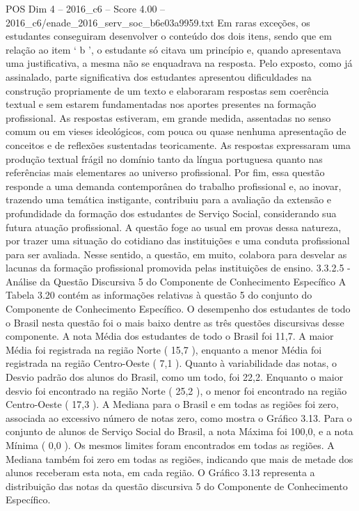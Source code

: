 \begin{textsample}{POS Dim 4 – 2016\_c6 – Score 4.00 – 2016\_c6/enade\_2016\_serv\_soc\_b6e03a9959.txt}
Em raras exceções, os estudantes conseguiram desenvolver o conteúdo dos dois itens, sendo que em relação ao item ‘ b ’, o estudante só citava um princípio e, quando apresentava uma justificativa, a mesma não se enquadrava na resposta.
Pelo exposto, como já assinalado, parte significativa dos estudantes apresentou dificuldades na construção propriamente de um texto e elaboraram respostas sem coerência textual e sem estarem fundamentadas nos aportes presentes na formação profissional.
As respostas estiveram, em grande medida, assentadas no senso comum ou em vieses ideológicos, com pouca ou quase nenhuma apresentação de conceitos e de reflexões sustentadas teoricamente.
As respostas expressaram uma produção textual frágil no domínio tanto da língua portuguesa quanto nas referências mais elementares ao universo profissional.
Por fim, essa questão responde a uma demanda contemporânea do trabalho profissional e, ao inovar, trazendo uma temática instigante, contribuiu para a avaliação da extensão e profundidade da formação dos estudantes de Serviço Social, considerando sua futura atuação profissional.
A questão foge ao usual em provas dessa natureza, por trazer uma situação do cotidiano das instituições e uma conduta profissional para ser avaliada.
Nesse sentido, a questão, em muito, colabora para desvelar as lacunas da formação profissional promovida pelas instituições de ensino. 3.3.2.5 - Análise da Questão Discursiva 5 do Componente de Conhecimento Específico A Tabela 3.20 contém as informações relativas à questão 5 do conjunto do Componente de Conhecimento Específico.
O desempenho dos estudantes de todo o Brasil nesta questão foi o mais baixo dentre as três questões discursivas desse componente.
A nota Média dos estudantes de todo o Brasil foi 11,7.
A maior Média foi registrada na região Norte ( 15,7 ), enquanto a menor Média foi registrada na região Centro-Oeste ( 7,1 ).
Quanto à variabilidade das notas, o Desvio padrão dos alunos do Brasil, como um todo, foi 22,2.
Enquanto o maior desvio foi encontrado na região Norte ( 25,2 ), o menor foi encontrado na região Centro-Oeste ( 17,3 ).
A Mediana para o Brasil e em todas as regiões foi zero, associada ao excessivo número de notas zero, como mostra o Gráfico 3.13.
Para o conjunto de alunos de Serviço Social do Brasil, a nota Máxima foi 100,0, e a nota Mínima ( 0,0 ).
Os mesmos limites foram encontrados em todas as regiões.
A Mediana também foi zero em todas as regiões, indicando que mais de metade dos alunos receberam esta nota, em cada região.
O Gráfico 3.13 representa a distribuição das notas da questão discursiva 5 do Componente de Conhecimento Específico.

\end{textsample}
